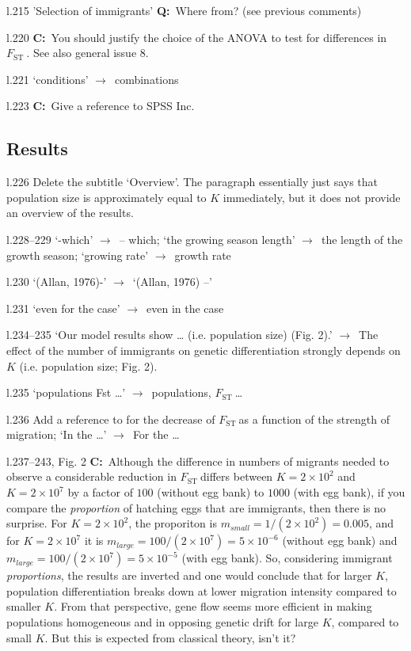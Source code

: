 \documentclass[11pt]{article}
\newenvironment{my_description}
{\begin{description}
  \setlength{\itemsep}{2pt}
  \setlength{\parskip}{0pt}
  \setlength{\parsep}{0pt}}
{\end{description}}
\newcommand{\ra}{$\rightarrow$\ }
\newcommand{\C}{\textbf{C:}\ }
\newcommand{\Q}{\textbf{Q:}\ }
\newcommand{\fst}{$F_{\mathrm{ST}}\ $}
\begin{document}
\begin{my_description}
	\item[l.215] 'Selection of immigrants' \Q Where from? (see previous comments)
	\item[l.220] \C You should justify the choice of the ANOVA to test for differences in \fst. See also general issue 8.
	\item[l.221] `conditions' \ra combinations
	\item[l.223] \C Give a reference to SPSS Inc.
\end{my_description}

\subsection{Results}
\begin{my_description}
	\item[l.226] Delete the subtitle `Overview'. The paragraph essentially just says that population size is approximately equal to $K$ immediately, but it does not provide an overview of the results.
	\item[l.228--229] `-which' \ra -- which; `the growing season length' \ra the length of the growth season; `growing rate' \ra growth rate
	\item[l.230] `(Allan, 1976)-' \ra `(Allan, 1976) --' 
	\item[l.231] `even for the case' \ra even in the case
	\item[l.234--235] `Our model results show \ldots{} (i.e. population size) (Fig. 2).' \ra The effect of the number of immigrants on genetic differentiation strongly depends on $K$ (i.e. population size; Fig. 2).
	\item[l.235] `populations Fst \ldots{}' \ra populations, \fst \ldots{}
	\item[l.236] Add a reference to \citet{Wright:1931rr} for the decrease of \fst as a function of the strength of migration; `In the \ldots{}' \ra For the \ldots{}
	\item[l.237--243, Fig. 2] \C Although the difference in numbers of migrants needed to observe a considerable reduction in \fst differs between $K = 2 \times 10^2$ and $K = 2 \times 10^7$ by a factor of $100$ (without egg bank)  to $1000$ (with egg bank), if you compare the \emph{proportion} of hatching eggs that are immigrants, then there is no surprise. For $K=2\times10^2$, the proporiton is $m_{\mathit{small}} = 1/(2\times10^2) = 0.005$, and for $K=2\times10^7$ it is $m_{\mathit{large}} = 100/(2\times10^7) = 5\times10^{-6}$ (without egg bank) and $m_{\mathit{large}} = 100/(2\times10^7) = 5\times 10^{-5}$ (with egg bank). So, considering immigrant \emph{proportions}, the results are inverted and one would conclude that for larger $K$, population differentiation breaks down at lower migration intensity compared to smaller $K$. From that perspective, gene flow seems more efficient in making populations homogeneous and in opposing genetic drift for large $K$, compared to small $K$. But this is expected from classical theory, isn't it?

\end{my_description}
\end{document}

